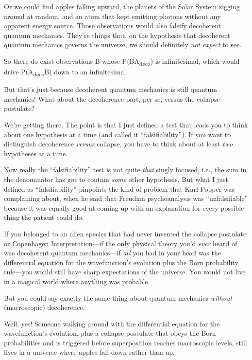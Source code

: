 {
 Or we could find apples falling upward, the planets of the Solar
System zigging around at random, and an atom that kept emitting photons
without any apparent energy source. Those observations would also
falsify decoherent quantum mechanics. They're things
that, on the hypothesis that decoherent quantum mechanics governs the
universe, we should definitely \textit{not expect} to see.}

{
 So there do exist observations B whose
P(B{\textbar}A\textsubscript{deco}) is infinitesimal, which would drive
P(A\textsubscript{deco}{\textbar}B) down to an infinitesimal.}

{
 But that's just because decoherent quantum
mechanics is still quantum mechanics! What about the decoherence part,
per se, versus the collapse postulate?}

{
 We're getting there. The point is that I just
defined a test that leads you to think about one hypothesis at a time
(and called it ``falsifiability'').
If you want to distinguish decoherence \textit{versus} collapse, you
have to think about at least \textit{two} hypotheses at a time.}

{
 Now really the
``falsifiability'' test is not quite
\textit{that} singly focused, i.e., the sum in the denominator has got
to contain \textit{some} other hypothesis. But what I just defined as
``falsifiability'' pinpoints the
kind of problem that Karl Popper was complaining about, when he said
that Freudian psychoanalysis was
``unfalsifiable'' because it was
equally good at coming up with an explanation for every possible thing
the patient could do.}

{
 If you belonged to an alien species that had never invented the
collapse postulate or Copenhagen Interpretation---if the only physical
theory you'd \textit{ever} heard of was decoherent
quantum mechanics---if \textit{all} you had in your head was the
differential equation for the wavefunction's evolution
plus the Born probability rule---you would still have sharp
expectations of the universe. You would not live in a magical world
where anything was probable.}

{
 But you could say exactly the same thing about quantum mechanics
\textit{without} (macroscopic) decoherence.}

{
 Well, yes! Someone walking around with the differential equation
for the wavefunction's evolution, plus a collapse
postulate that obeys the Born probabilities and is triggered before
superposition reaches macroscopic levels, still lives in a universe
where apples fall down rather than up.}

